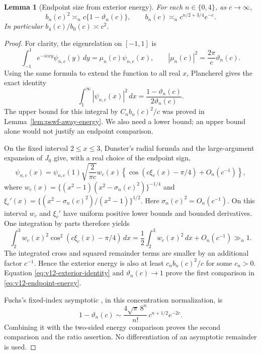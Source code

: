 \documentclass[11pt]{article}
\newtheorem{lemma}[theorem]{Lemma}
\theoremstyle{remark}
\begin{document}
\begin{lemma}[Endpoint size from exterior energy]
\label{lem:v12-endpoint-energy}
For each $n\in\{0,4\}$, as $c\to\infty$,
\begin{equation}\label{eq:v12-endpoint-energy}
 b_n(c)^2\asymp_n c\{1-\vartheta_n(c)\},\qquad
 b_n(c)\asymp_n c^{n/2+3/4}e^{-c}.
\end{equation}
In particular $b_4(c)/b_0(c)\asymp c^2$.
\end{lemma}
\begin{proof}
For clarity, the eigenrelation on $[-1,1]$ is
\[
 \int_{-1}^{1}e^{-icxy}\psi_{n,c}(y)\,dy
       =\mu_n(c)\psi_{n,c}(x),\qquad
 |\mu_n(c)|^2=\frac{2\pi}{c}\vartheta_n(c).
\]
Using the same formula to extend the function to all real $x$, Plancherel
gives the exact identity
\begin{equation}\label{eq:v12-exterior-identity}
 \int_1^\infty |\psi_{n,c}(x)|^2\,dx
     =\frac{1-\vartheta_n(c)}{2\vartheta_n(c)}.
\end{equation}
The upper bound for this integral by $C_nb_n(c)^2/c$ was proved in
Lemma~\ref{lem:pswf-away-energy}. We also need a lower bound; an upper
bound alone would not justify an endpoint comparison.

On the fixed interval $2\le x\le3$, Dunster's radial formula
\cite[eqs.~(3.5)--(3.7)]{Dunster2017} and the large-argument expansion
of $J_0$ give, with a real choice of the endpoint sign,
\[
 \psi_{n,c}(x)=\psi_{n,c}(1)\sqrt{\frac{2}{\pi c}}
 w_c(x)\left\{\cos(c\xi_c(x)-\pi/4)+O_n(c^{-1})\right\},
\]
where $w_c(x)=\{(x^2-1)(x^2-\sigma_n(c)^2)\}^{-1/4}$ and
$\xi_c'(x)=\{(x^2-\sigma_n(c)^2)/(x^2-1)\}^{1/2}$.
Here $\sigma_n(c)^2=O_n(c^{-1})$. On this interval $w_c$ and
$\xi_c'$ have uniform positive lower bounds and bounded derivatives.
One integration by parts therefore yields
\[
 \int_2^3 w_c(x)^2\cos^2(c\xi_c(x)-\pi/4)\,dx
      =\frac12\int_2^3w_c(x)^2\,dx+O_n(c^{-1})\gg_n1.
\]
The integrated cross and squared remainder terms are smaller by an
additional factor $c^{-1}$. Hence the exterior energy is also at least
$c_n b_n(c)^2/c$ for some $c_n>0$. Equation
\eqref{eq:v12-exterior-identity} and $\vartheta_n(c)\to1$ prove the
first comparison in \eqref{eq:v12-endpoint-energy}.

Fuchs's fixed-index asymptotic \cite[Theorem~1]{Fuchs1964}, in this
concentration normalization, is
\begin{equation}\label{eq:v12-fuchs}
 1-\vartheta_n(c)\sim
 \frac{4\sqrt\pi\,8^n}{n!}\,c^{n+1/2}e^{-2c}.
\end{equation}
Combining it with the two-sided energy comparison proves the second
comparison and the ratio assertion. No differentiation of an asymptotic
remainder is used.
\end{proof}
\end{document}
